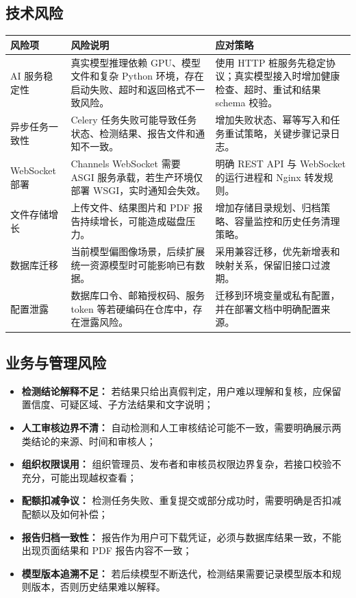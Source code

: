 \subsection{技术风险}
\begin{longtable}{|p{3.2cm}|p{6.1cm}|p{4.4cm}|}
\hline
风险项 & 风险说明 & 应对策略 \\ \hline
AI 服务稳定性 & 真实模型推理依赖 GPU、模型文件和复杂 Python 环境，存在启动失败、超时和返回格式不一致风险。 & 使用 HTTP 桩服务先稳定协议；真实模型接入时增加健康检查、超时、重试和结果 schema 校验。 \\ \hline
异步任务一致性 & Celery 任务失败可能导致任务状态、检测结果、报告文件和通知不一致。 & 增加失败状态、幂等写入和任务重试策略，关键步骤记录日志。 \\ \hline
WebSocket 部署 & Channels WebSocket 需要 ASGI 服务承载，若生产环境仅部署 WSGI，实时通知会失效。 & 明确 REST API 与 WebSocket 的运行进程和 Nginx 转发规则。 \\ \hline
文件存储增长 & 上传文件、结果图片和 PDF 报告持续增长，可能造成磁盘压力。 & 增加存储目录规划、归档策略、容量监控和历史任务清理策略。 \\ \hline
数据库迁移 & 当前模型偏图像场景，后续扩展统一资源模型时可能影响已有数据。 & 采用兼容迁移，优先新增表和映射关系，保留旧接口过渡期。 \\ \hline
配置泄露 & 数据库口令、邮箱授权码、服务 token 等若硬编码在仓库中，存在泄露风险。 & 迁移到环境变量或私有配置，并在部署文档中明确配置来源。 \\ \hline
\end{longtable}

\subsection{业务与管理风险}
\begin{itemize}[leftmargin=2em]
    \item \textbf{检测结论解释不足：} 若结果只给出真假判定，用户难以理解和复核，应保留置信度、可疑区域、子方法结果和文字说明；
    \item \textbf{人工审核边界不清：} 自动检测和人工审核结论可能不一致，需要明确展示两类结论的来源、时间和审核人；
    \item \textbf{组织权限误用：} 组织管理员、发布者和审核员权限边界复杂，若接口校验不充分，可能出现越权查看；
    \item \textbf{配额扣减争议：} 检测任务失败、重复提交或部分成功时，需要明确是否扣减配额以及如何补偿；
    \item \textbf{报告归档一致性：} 报告作为用户可下载凭证，必须与数据库结果一致，不能出现页面结果和 PDF 报告内容不一致；
    \item \textbf{模型版本追溯不足：} 若后续模型不断迭代，检测结果需要记录模型版本和规则版本，否则历史结果难以解释。
\end{itemize}

